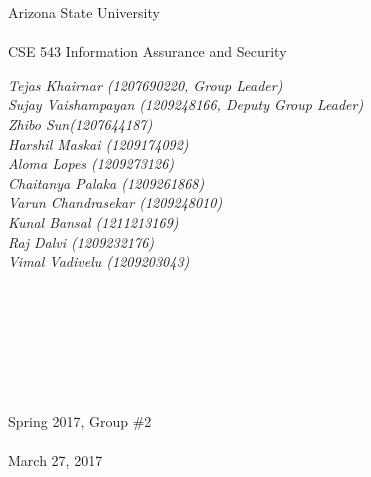 \documentclass[11pt]{article}
\title{\fulltitle}
\date{}
\begin{document}
	\begingroup
		\fontsize{20pt}{20pt}\selectfont
		\begin{center}
			Arizona State University \\~\\
			CSE 543 Information Assurance and Security
		\end{center}
	\endgroup
	{\let\newpage\relax\maketitle}
	\begingroup
	\fontsize{15pt}{15pt}\selectfont
	\begin{center}
		\textit{Tejas Khairnar (1207690220, Group Leader) \\Sujay Vaishampayan (1209248166, Deputy Group Leader)\\  Zhibo Sun(1207644187)\\Harshil Maskai (1209174092)\\ Aloma Lopes (1209273126)\\ Chaitanya Palaka (1209261868)\\ Varun Chandrasekar (1209248010) \\ Kunal Bansal (1211213169) \\ Raj Dalvi (1209232176) \\ Vimal Vadivelu (1209203043)\\ \\}
	\end{center}
	\endgroup\\~\\
	\begin{abstract}
		\textbf{\textit{There are multitude of potentially malicious samples out there in the wild. The signatures for these malwares are mainly created manually. This creates a semantic gap while detecting known piece of malware and unknown pieces of malwares. This survey article provides an overview of various techniques used to perform malware analysis, detect and prevent them. It also covers various strategies to detect these malwares pro-actively and be one step ahead of the attackers.}}
	\end{abstract}\\~\\
		\begingroup
		\fontsize{10pt}{10pt}\selectfont
			\begin{center}
				Spring 2017, Group \#2 \\~\\
				March 27, 2017
			\end{center}
		\endgroup
\end{document}
